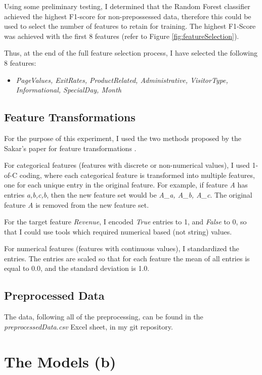 \documentclass{article}
\begin{document}
Using some preliminary testing, I determined that the Random Forest classifier achieved the highest F1-score for non-prepossessed data, therefore this could be used to select the number of features to retain for training. The highest F1-Score was achieved with the first 8 features (refer to Figure \ref{fig:featureSelection}).

Thus, at the end of the full feature selection process, I have selected the following 8 features:
\begin{itemize}
\item \emph{PageValues, ExitRates, ProductRelated, Administrative, VisitorType, Informational, SpecialDay, Month}
\end{itemize}

\subsection{Feature Transformations}

For the purpose of this experiment, I used the two methods proposed by the Sakar's paper for feature transformations \cite{sakar_polat_katircioglu_kastro_2018}. 
	
For categorical features (features with discrete or non-numerical values), I used 1-of-C coding, where each categorical feature is transformed into multiple features, one for each unique entry in the original feature. For example, if feature \emph{A} has entries \emph{a,b,c,b}, then the new feature set would be \emph{A\_a, A\_b, A\_c}. The original feature \emph{A} is removed from the new feature set. 

For the target feature \emph{Revenue}, I encoded \emph{True} entries to 1, and \emph{False} to 0, so that I could use tools which required numerical based (not string) values.
	
For numerical features (features with continuous values), I standardized the entries. The entries are scaled so that for each feature the mean of all entries is equal to 0.0, and the standard deviation is 1.0. 

\subsection{Preprocessed Data}

The data, following all of the preprocessing, can be found in the \emph{preprocessedData.csv} Excel sheet, in my git repository. 

\section{The Models (b)}
\end{document}
